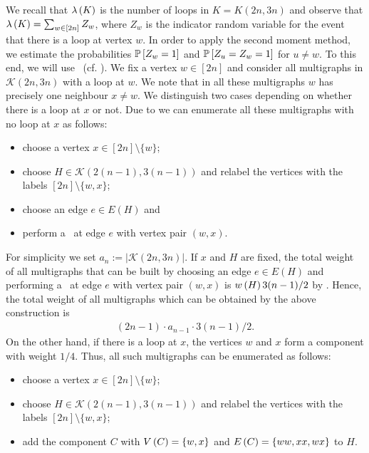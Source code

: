 We recall that $\lambda\left(K\right)$ is the number of loops in $K=K(2n,3n)$ and observe that $\lambda\left(K\right)=\sum_{w\in [2n]}Z_w$, where $Z_w$ is the indicator random variable for the event that there is a loop at vertex $w$. In order to apply the second moment method, we estimate the probabilities $\mathbb{P}\left[Z_w=1\right]$ and $\mathbb{P}\left[Z_u=Z_w=1\right]$ for $u\neq w$. To this end, we will use \loopInsertions\ (cf. ). We fix a vertex $w \in [2n]$ and consider all multigraphs in $\mathcal{K}(2n,3n)$ with a loop at $w$. We note that in all these multigraphs $w$ has precisely one neighbour $x\neq w$. We distinguish two cases depending on whether there is a loop at $x$ or not. Due to  we can enumerate all these multigraphs with no loop at $x$ as follows:
\begin{itemize}
	\item
	choose a vertex $x \in [2n]\setminus\{w\}$;
	\item
	choose $H\in \mathcal{K}(2(n-1), 3(n-1))$ and relabel the vertices with the labels $[2n]\setminus \{w, x\}$;
	\item
	choose an edge $e \in E(H)$ and
	\item[] 
	 perform a \loopInsertion\ at edge $e$ with vertex pair $(w,x)$.
\end{itemize}
For simplicity we set $a_n:=\left|\mathcal{K}(2n,3n)\right|$. If $x$ and $H$ are fixed, the total weight of all multigraphs that can be built by choosing an edge $e\in E(H)$ and performing a \loopInsertion\ at edge $e$ with vertex pair $(w,x)$ is $w\left(H\right)3(n-1)/2$ by . Hence, the total weight of all multigraphs which can be obtained by the above construction is
\begin{align}\label{CBeq:construction_1}
(2n-1)\cdot a_{n-1} \cdot 3(n-1)/2.
\end{align}
On the other hand, if there is a loop at $x$, the vertices $w$ and $x$ form a component with weight $1/4$. Thus, all such multigraphs can be enumerated as follows:
\begin{itemize}
	\item
	choose a vertex $x \in [2n]\setminus\{w\}$;
	\item
	choose $H\in \mathcal{K}(2(n-1), 3(n-1))$ and relabel the vertices with the labels $[2n]\setminus \{w, x\}$;
	\item
	add the component $C$ with $V\left(C\right)=\{w,x\}$ and $E\left(C\right)=\{ww, xx, wx\}$ to $H$.
\end{itemize}
